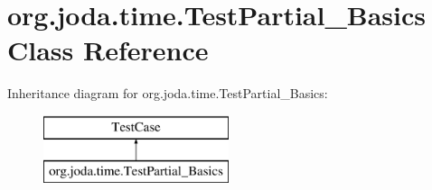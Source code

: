 \hypertarget{classorg_1_1joda_1_1time_1_1_test_partial___basics}{\section{org.\-joda.\-time.\-Test\-Partial\-\_\-\-Basics Class Reference}
\label{classorg_1_1joda_1_1time_1_1_test_partial___basics}
}
Inheritance diagram for org.\-joda.\-time.\-Test\-Partial\-\_\-\-Basics\-:\begin{figure}[H]
\begin{center}
\leavevmode
\includegraphics[height=2.000000cm]{classorg_1_1joda_1_1time_1_1_test_partial___basics}
\end{center}
\end{figure}
